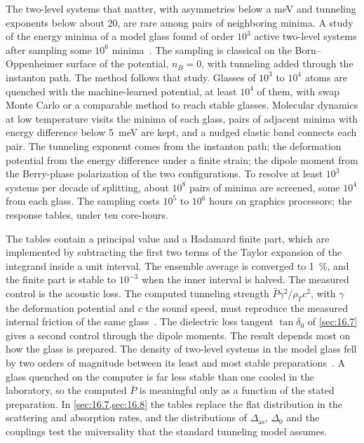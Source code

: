 The two-level systems that matter, with asymmetries below a meV and tunneling exponents below about 20, are rare among pairs of neighboring minima. A study of the energy minima of a model glass found of order $10^3$ active two-level systems after sampling some $10^6$ minima~\cite{khomenko2020depletion}. The sampling is classical on the Born--Oppenheimer surface of the potential, $n_B = 0$, with tunneling added through the instanton path. The method follows that study. Glasses of $10^3$ to $10^4$ atoms are quenched with the machine-learned potential, at least $10^4$ of them, with swap Monte Carlo or a comparable method to reach stable glasses. Molecular dynamics at low temperature visits the minima of each glass, pairs of adjacent minima with energy difference below \SI{5}{meV} are kept, and a nudged elastic band connects each pair. The tunneling exponent comes from the instanton path; the deformation potential from the energy difference under a finite strain; the dipole moment from the Berry-phase polarization of the two configurations. To resolve at least $10^3$ systems per decade of splitting, about $10^8$ pairs of minima are screened, some $10^4$ from each glass. The sampling costs $10^5$ to $10^6$ hours on graphics processors; the response tables, under ten core-hours.

The tables contain a principal value and a Hadamard finite part, which are implemented by subtracting the first two terms of the Taylor expansion of the integrand inside a unit interval. The ensemble average is converged to \SI{1}{\percent}, and the finite part is stable to $10^{-3}$ when the inner interval is halved. The measured control is the acoustic loss. The computed tunneling strength $\bar P\gamma^2/\rho_Tc^2$, with $\gamma$ the deformation potential and $c$ the sound speed, must reproduce the measured internal friction of the same glass~\cite{phillips1987two}. The dielectric loss tangent $\tan\delta_0$ of \cref{sec:16.7} gives a second control through the dipole moments. The result depends most on how the glass is prepared. The density of two-level systems in the model glass fell by two orders of magnitude between its least and most stable preparations~\cite{khomenko2020depletion}. A glass quenched on the computer is far less stable than one cooled in the laboratory, so the computed $\bar P$ is meaningful only as a function of the stated preparation. In \cref{sec:16.7,sec:16.8} the tables replace the flat distribution in the scattering and absorption rates, and the distributions of $\Delta_{\mathrm{as}}$, $\Delta_0$ and the couplings test the universality that the standard tunneling model assumes.

